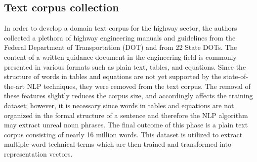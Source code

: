 \documentclass[Journal, BackFigs, DoubleSpace]{ascelike}%
\begin{document}
%
%
\subsection{Text corpus collection}
In order to develop a domain text corpus for the highway sector, the authors collected a plethora of highway engineering manuals and guidelines from the Federal Department of Transportation (DOT) and from 22 State DOTs. The content of a written guidance document in the engineering field is commonly presented in various formats such as plain text, tables, and equations. Since the structure of words in tables and equations are not yet supported by the state-of-the-art NLP techniques, they were removed from the text corpus. The removal of these features slightly reduces the corpus size, and accordingly affects the training dataset; however, it is necessary since words in tables and equations are not organized in the formal structure of a sentence and therefore the NLP algorithm may extract unreal noun phrases. The final outcome of this phase is a plain text corpus consisting of nearly 16 million words. This dataset is utilized to extract multiple-word technical terms which are then trained and transformed into representation vectors.
%
\end{document}
